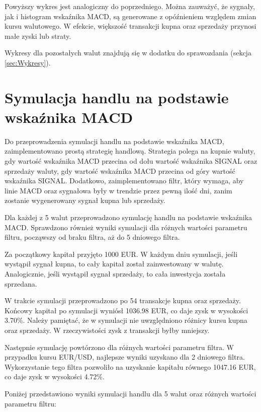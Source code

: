 \documentclass[12pt, a4paper]{article}
\begin{document}
Powyższy wykres jest analogiczny do poprzedniego. Można zauważyć, że sygnały, jak i histogram
wskaźnika MACD, są generowane z opóźnieniem względem zmian kursu walutowego. W efekcie, większość
transakcji  kupna oraz sprzedaży przynosi małe zyski lub straty.

Wykresy dla pozostałych walut znajdują się w dodatku do sprawozdania (sekcja \ref{sec:Wykresy}).


\section{Symulacja handlu na podstawie wskaźnika MACD}

Do przeprowadzenia symulacji handlu na podstawie wskaźnika MACD, zaimplementowano
prostą strategię handlową. Strategia polega na kupnie waluty, gdy wartość wskaźnika MACD
przecina od dołu wartość wskaźnika SIGNAL oraz sprzedaży waluty, gdy wartość wskaźnika MACD
przecina od góry wartość wskaźnika SIGNAL.
Dodatkowo, zaimplementowano filtr, który wymaga, aby linie MACD oraz sygnałowa były w trendzie
przez pewną ilość dni, zanim zostanie wygenerowany sygnał kupna lub sprzedaży.

Dla każdej z 5 walut przeprowadzono symulację handlu na podstawie wskaźnika MACD. Sprawdzono również
wyniki symulacji dla różnych wartości parametru filtru, począwszy od braku filtra, aż do 5 dniowego filtra.

Za początkowy kapitał przyjęto 1000 EUR. W każdym dniu symulacji, jeśli wystąpił sygnał kupna, to cały kapitał
został zainwestowany w walutę. Analogicznie, jeśli wystąpił sygnał sprzedaży, to cała inwestycja została sprzedana.

W trakcie symulacji przeprowadzono po 54 transakcje kupna oraz sprzedaży.
Końcowy kapitał po symulacji wyniósł 1036.98 EUR, co daje zysk w wysokości 3.70\%.
Należy pamiętać, że w symulacji nie uwzględniono różnicy kursu kupna oraz sprzedaży.
W rzeczywistości zysk z transakcji byłby mniejszy.

Następnie symulację powtórzono dla różnych wartości parametru filtra.
W przypadku kursu EUR/USD, najlepsze wyniki uzyskano dla 2 dniowego filtra.
Wykorzystanie tego filtra pozwoliło na uzyskanie kapitału równego 1047.16 EUR,
co daje zysk w wysokości 4.72\%.

\pagebreak







Poniżej przedstawiono wyniki symulacji handlu dla 5 walut oraz różnych wartości parametru filtru:
\end{document}
